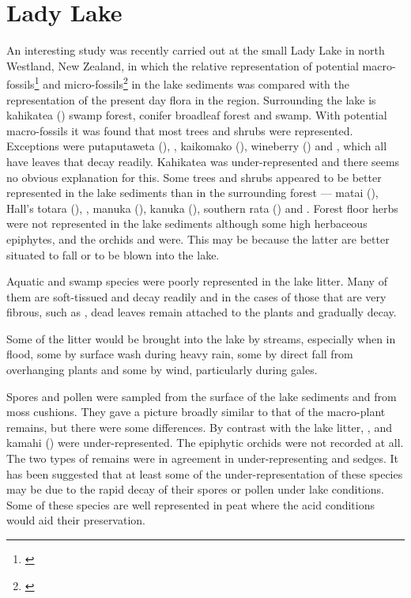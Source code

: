\section{Lady Lake}

An interesting study was recently carried out at the small Lady Lake in north Westland, New Zealand, in which the relative representation of potential macro-fossils\footnote{\cite{drake1980influx}} and micro-fossils\footnote{\cite{pocknall1980modern}} in the lake sediments was compared with the representation of the present day flora in the region.
Surrounding the lake is kahikatea () swamp forest, conifer broadleaf forest and swamp.
With potential macro-fossils it was found that most trees and shrubs were represented.
Exceptions were putaputaweta (),  , kaikomako (), wineberry () and , which all have leaves that decay readily.
Kahikatea was under-represented and there seems no obvious explanation for this.
Some trees and shrubs appeared to be better represented in the lake sediments than in the surrounding forest --- matai (), Hall's totara (), , manuka (), kanuka (), southern rata () and .
Forest floor herbs were not represented in the lake sediments although some high herbaceous epiphytes,  and the orchids  and  were.
This may be because the latter are better situated to fall or to be blown into the lake.

Aquatic and swamp species were poorly represented in the lake litter.
Many of them are soft-tissued and decay readily and in the cases of those that are very fibrous, such as , dead leaves remain attached to the plants and gradually decay.

Some of the litter would be brought into the lake by streams, especially when in flood, some by surface wash during heavy rain, some by direct fall from overhanging plants and some by wind, particularly during gales.

Spores and pollen were sampled from the surface of the lake sediments and from moss cushions.
They gave a picture broadly similar to that of the macro-plant remains, but there were some differences.
By contrast with the lake litter, ,   and kamahi () were under-represented.
The epiphytic orchids were not recorded at all.
The two types of remains were in agreement in under-representing  and sedges.
It has been suggested that at least some of the under-representation of these species may be due to the rapid decay of their spores or pollen under lake conditions.
Some of these species are well represented in peat where the acid conditions would aid their preservation.

